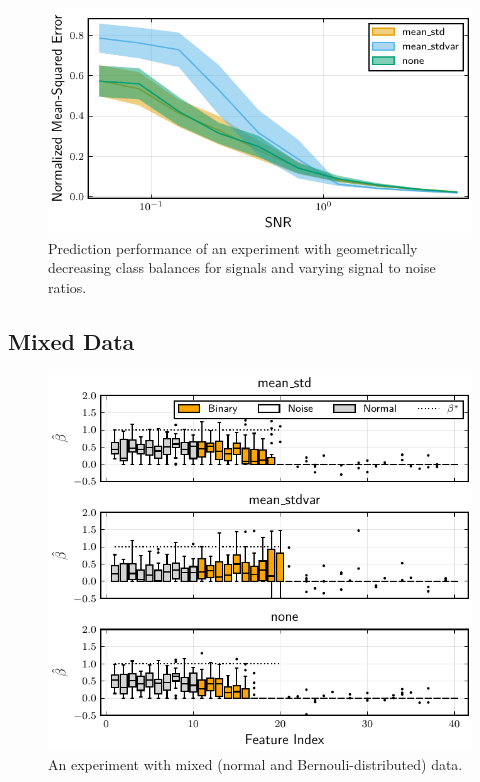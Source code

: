 \begin{figure}[htpb]
  \centering
  \includegraphics[]{plots/binary_decreasing_snr.pdf}
  \caption{%
    Prediction performance of an experiment with geometrically decreasing class balances for signals and varying signal to noise ratios.
  }
  \label{fig:binary-decreasing-snr}
\end{figure}

\subsection{Mixed Data}

\begin{figure}[htpb]
  \centering
  \includegraphics[]{plots/mixed_data.pdf}
  \caption{%
    An experiment with mixed (normal and Bernouli-distributed) data.
  }
  \label{fig:mixed-data}
\end{figure}


\printbibliography


